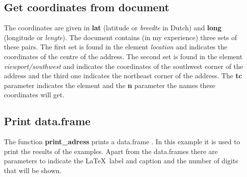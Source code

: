 \documentclass[]{article}
\newenvironment{Shaded}{\begin{snugshade}}{\end{snugshade}}
\newcommand{\KeywordTok}[1]{\textcolor[rgb]{0.13,0.29,0.53}{\textbf{{#1}}}}
\newcommand{\DataTypeTok}[1]{\textcolor[rgb]{0.13,0.29,0.53}{{#1}}}
\newcommand{\StringTok}[1]{\textcolor[rgb]{0.31,0.60,0.02}{{#1}}}
\newcommand{\NormalTok}[1]{{#1}}
\newcommand{\mytextit}[1]{\textit{#1}}
\newcommand{\mytextbf}[1]{\textbf{#1}}
\begin{document}
\subsection{Get coordinates from
document}\label{get-coordinates-from-document}

The coordinates are given in \mytextbf{lat} (latitude or
\mytextit{breedte} in Dutch) and \mytextbf{long} (longitude or
\mytextit{lengte}). The document contains (in my experience) three sets
of these pairs. The first set is found in the element
\mytextit{location} and indicates the coordinates of the centre of the
address. The second set is found in the element
\mytextit{viewport/southwest} and indicates the coordinates of the
southwest corner of the address and the third one indicates the
northeast corner of the address. The \mytextbf{tc} parameter indicates
the element and the \mytextbf{n} parameter the names these coordinates
will get.

\begin{Shaded}
\end{Shaded}

\subsection{Print data.frame}\label{print-data.frame}

The function \mytextbf{print\_adress} prints a data.frame . In this
example it is used to print the results of the examples. Apart from the
data.frames there are parameters to indicate the \LaTeX~label and
caption and the number of digits that will be shown.
\end{document}

